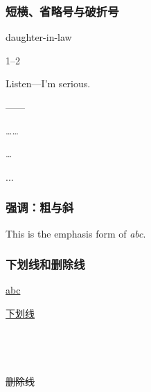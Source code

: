         \subsubsection{短横、省略号与破折号}
            daughter-in-law

            1--2
            
            Listen---I'm serious.
        
            ——
            
            ……
            
            \ldots
            
            ...

	    \subsubsection{强调：粗与斜}
            This is the emphasis form of \emph{abc}.
    
	    \subsubsection{下划线和删除线}
            \underline{abc} 
		
            \uline{下划线}\\
            \\
            \\
            \\
            \\
            \sout{删除线}\\

